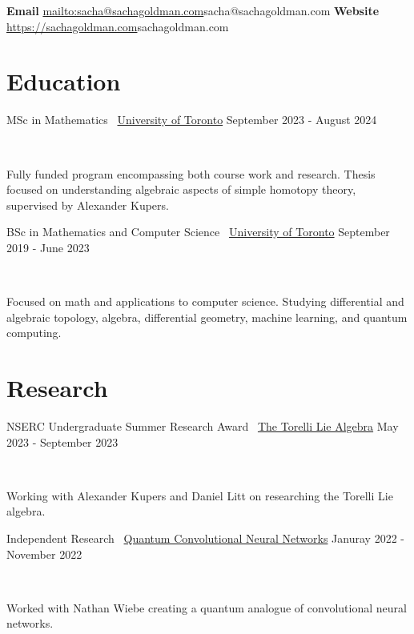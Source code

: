 \documentclass[]{style}
\begin{document}

\vspace{-5mm}
\begin{center}
	\textbf{Email}
	\url{mailto:sacha@sachagoldman.com}{sacha@sachagoldman.com} \hspace{1cm}
	\textbf{Website} 
	\url{https://sachagoldman.com}{sachagoldman.com}
\end{center}
\vspace{5mm}
 
\section{Education}

\begin{entrylist}

\vspace{1mm}

\entry
{MSc in Mathematics \ {\normalfont \underline{University of Toronto}}}
{September 2023 - August 2024}
{  ~ \vspace{-2.5mm}

Fully funded program encompassing both course work and research. Thesis focused on understanding algebraic aspects of simple homotopy theory, supervised by Alexander Kupers.
}

\entry
{BSc in Mathematics and Computer Science \ {\normalfont \underline{University of Toronto}}}
{September 2019 - June 2023}
{ ~ \vspace{-2.5mm}

Focused on math and applications to computer science. Studying differential  and algebraic topology, algebra, differential geometry, machine learning, and quantum computing.
}

\end{entrylist}

\section{Research}

\begin{entrylist}

\vspace{1mm}

\entry
{NSERC Undergraduate Summer Research Award \ {\normalfont \underline{The Torelli Lie Algebra}}}
{May 2023 - September 2023}
{ ~ \vspace{-2.5mm}

Working with Alexander Kupers and Daniel Litt on researching the Torelli Lie algebra.}

\entry
{Independent Research \ {\normalfont \underline{Quantum Convolutional Neural Networks}}}
{Januray 2022 - November 2022}
{ ~ \vspace{-2.5mm}

Worked with Nathan Wiebe creating a quantum analogue of convolutional neural networks.}

\end{entrylist}
\end{document}

